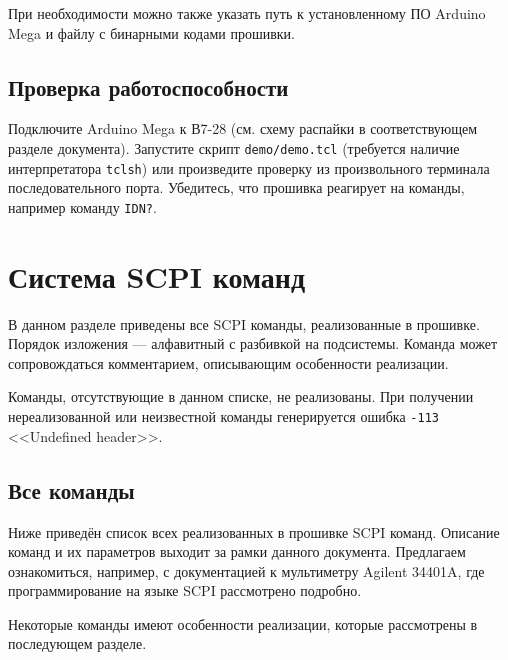 \documentclass[12pt, a4paper]{article}
\newcommand{\SCPI}{\mbox{SCPI}}
\newcommand{\V}{\mbox{В7-28}}
\newcommand{\Arduino}{Arduino Mega}
\newcommand{\CMD}[1]{{\tt #1}}
\begin{document}
При необходимости можно также указать путь к установленному ПО \Arduino{} и файлу с бинарными кодами прошивки.

\subsection{Проверка работоспособности}

Подключите \Arduino{} к \V{} (см. схему распайки в соответствующем разделе документа). Запустите скрипт {\tt demo/demo.tcl} (требуется наличие интерпретатора {\tt tclsh}) или произведите проверку из произвольного терминала последовательного порта. Убедитесь, что прошивка реагирует на команды, например команду \CMD{*IDN?}.

\section{Система SCPI команд}

В данном разделе приведены все \SCPI{} команды, реализованные в прошивке. Порядок изложения --- алфавитный с разбивкой на подсистемы. Команда может сопровождаться комментарием, описывающим особенности реализации.

Команды, отсутствующие в данном списке, не реализованы. При получении нереализованной или неизвестной команды генерируется ошибка \CMD{-113} <<Undefined header>>.

\subsection{Все команды}

Ниже приведён список  всех реализованных в прошивке SCPI команд. Описание команд и их параметров выходит за рамки данного документа. Предлагаем ознакомиться, например, с документацией к мультиметру Agilent 34401A, где программирование на языке SCPI рассмотрено подробно.

Некоторые команды имеют особенности реализации, которые рассмотрены в последующем разделе.
\end{document}
